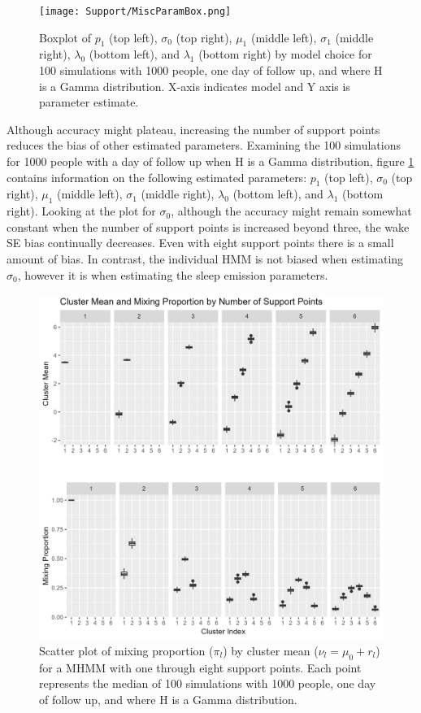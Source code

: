 \documentclass{article}
\begin{document}
\begin{figure}
    \texttt{[image: Support/MiscParamBox.png]}
    \centering
    \caption{Boxplot of $p_1$ (top left), $\sigma_0$ (top right), $\mu_1$ (middle left), $\sigma_1$ (middle right), $\lambda_0$ (bottom left), and $\lambda_1$ (bottom right) by model choice for 100 simulations with 1000 people, one day of follow up, and where H is a Gamma distribution. X-axis indicates model and Y axis is parameter estimate.}
    \label{miscParam}
\end{figure}

Although accuracy might plateau, increasing the number of support points reduces the bias of other estimated parameters. Examining the 100 simulations for 1000 people with a day of follow up when H is a Gamma distribution, figure \ref{miscParam} contains information on the following estimated parameters: $p_1$ (top left), $\sigma_0$ (top right), $\mu_1$ (middle left), $\sigma_1$ (middle right), $\lambda_0$ (bottom left), and $\lambda_1$ (bottom right). Looking at the plot for $\sigma_0$, although the accuracy might remain somewhat constant when the number of support points is increased beyond three, the wake SE bias continually decreases. Even with eight support points there is a small amount of bias. In contrast, the individual HMM is not biased when estimating $\sigma_0$, however it is when estimating the sleep emission parameters. 

\begin{figure}
    \includegraphics[scale=.48]{Support/clustmeanmix.png}
    \centering
    \caption{Scatter plot of mixing proportion ($\pi_l$) by cluster mean ($\nu_l = \mu_0+r_l$) for a MHMM with one through eight support points. Each point represents the median of 100 simulations with 1000 people, one day of follow up, and where H is a Gamma distribution.}
    \label{CMM}
\end{figure}
\end{document}
